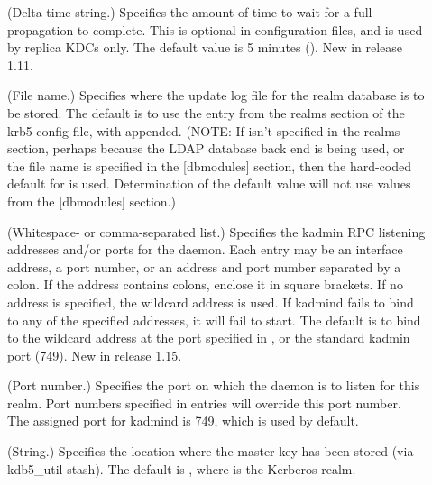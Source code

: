 \documentclass[letterpaper,10pt,english]{sphinxmanual}
\begin{document}
\begin{description}
\item[{}] \leavevmode
(Delta time string.)  Specifies the amount of time to wait for a
full propagation to complete.  This is optional in configuration
files, and is used by replica KDCs only.  The default value is 5
minutes ().  New in release 1.11.

\item[{}] \leavevmode
(File name.)  Specifies where the update log file for the realm
database is to be stored.  The default is to use the
 entry from the realms section of the krb5 config
file, with  appended.  (NOTE: If  isn’t
specified in the realms section, perhaps because the LDAP database
back end is being used, or the file name is specified in the
{[}dbmodules{]} section, then the hard-coded default for
 is used.  Determination of the 
default value will not use values from the {[}dbmodules{]} section.)

\item[{}] \leavevmode
(Whitespace- or comma-separated list.)  Specifies the kadmin RPC
listening addresses and/or ports for the {\hyperref[\detokenize{admin/admin_commands/kadmind:kadmind-8}]{}} daemon.
Each entry may be an interface address, a port number, or an
address and port number separated by a colon.  If the address
contains colons, enclose it in square brackets.  If no address is
specified, the wildcard address is used.  If kadmind fails to bind
to any of the specified addresses, it will fail to start.  The
default is to bind to the wildcard address at the port specified
in , or the standard kadmin port (749).  New in
release 1.15.

\item[{}] \leavevmode
(Port number.)  Specifies the port on which the {\hyperref[\detokenize{admin/admin_commands/kadmind:kadmind-8}]{}}
daemon is to listen for this realm.  Port numbers specified in
 entries will override this port number.  The
assigned port for kadmind is 749, which is used by default.

\item[{}] \leavevmode
(String.)  Specifies the location where the master key has been
stored (via kdb5\_util stash).  The default is {\hyperref[\detokenize{mitK5defaults:paths}]{}}, where  is the Kerberos realm.


\end{description}
\end{document}
